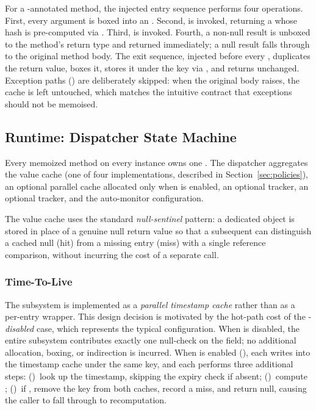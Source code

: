 For a -annotated method, the injected entry sequence performs four operations. First, every argument is boxed into an . Second,  is invoked, returning a  whose hash is pre-computed via . Third,  is invoked. Fourth, a non-null result is unboxed to the method's return type and returned immediately; a null result falls through to the original method body. The exit sequence, injected before every , duplicates the return value, boxes it, stores it under the key via , and returns unchanged. Exception paths () are deliberately skipped: when the original body raises, the cache is left untouched, which matches the intuitive contract that exceptions should not be memoised.

\subsection{Runtime: Dispatcher State Machine}\label{sec:runtime}

Every memoized method on every instance owns one . The dispatcher aggregates the value cache (one of four  implementations, described in Section~\ref{sec:policies}), an optional parallel  cache allocated only when \ttl is enabled, an optional  tracker, an optional  tracker, and the auto-monitor configuration.

The value cache uses the standard \emph{null-sentinel} pattern: a dedicated  object is stored in place of a genuine null return value so that a subsequent  can distinguish a cached null (hit) from a missing entry (miss) with a single reference comparison, without incurring the cost of a separate  call.

\subsubsection{Time-To-Live}\label{sec:ttl}

The \ttl subsystem is implemented as a \emph{parallel timestamp cache} rather than as a per-entry wrapper. This design decision is motivated by the hot-path cost of the \ttl-\emph{disabled} case, which represents the typical configuration. When \ttl is disabled, the entire subsystem contributes exactly one null-check on the  field; no additional allocation, boxing, or indirection is incurred. When \ttl is enabled (), each  writes  into the timestamp cache under the same key, and each  performs three additional steps: ()~look up the timestamp, skipping the expiry check if absent; ()~compute ; ()~if , remove the key from both caches, record a miss, and return null, causing the caller to fall through to recomputation.


